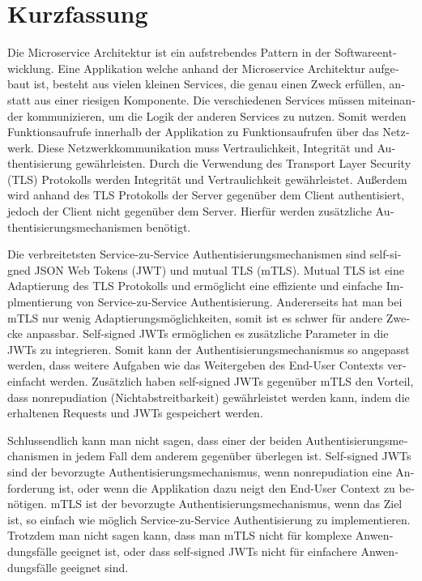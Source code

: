 \chapter{Kurzfassung}

\begin{german}
	Die Microservice Architektur ist ein aufstrebendes Pattern in der Softwareentwicklung.
	Eine Applikation welche anhand der Microservice Architektur aufgebaut ist, besteht aus vielen kleinen Services, die genau einen Zweck erfüllen, anstatt aus einer riesigen Komponente.
	Die verschiedenen Services müssen miteinander kommunizieren, um die Logik der anderen Services zu nutzen.
	Somit werden Funktionsaufrufe innerhalb der Applikation zu Funktionsaufrufen über das Netzwerk.
	Diese Netzwerkkommunikation muss Vertraulichkeit, Integrität und Authentisierung gewährleisten.
	Durch die Verwendung des Transport Layer Security (TLS) Protokolls werden Integrität und Vertraulichkeit gewährleistet.
	Außerdem wird anhand des TLS Protokolls der Server gegenüber dem Client authentisiert, jedoch der Client nicht gegenüber dem Server.
	Hierfür werden zusätzliche Authentisierungsmechanismen benötigt.

	Die verbreitetsten Service-zu-Service Authentisierungsmechanismen sind self-signed JSON Web Tokens (JWT) und mutual TLS (mTLS).
	Mutual TLS ist eine Adaptierung des TLS Protokolls und ermöglicht eine effiziente und einfache Implmentierung von Service-zu-Service Authentisierung.
	Andererseits hat man bei mTLS nur wenig Adaptierungsmöglichkeiten, somit ist es schwer für andere Zwecke anpassbar.
	Self-signed JWTs ermöglichen es zusätzliche Parameter in die JWTs zu integrieren.
	Somit kann der Authentisierungsmechanismus so angepasst werden, dass weitere Aufgaben wie das Weitergeben des End-User Contexts vereinfacht werden.
	Zusätzlich haben self-signed JWTs gegenüber mTLS den Vorteil, dass nonrepudiation (Nichtabstreitbarkeit) gewährleistet werden kann, indem die erhaltenen Requests und JWTs gespeichert werden.

	Schlussendlich kann man nicht sagen, dass einer der beiden Authentisierungsmechanismen in jedem Fall dem anderem gegenüber überlegen ist.
	Self-signed JWTs sind der bevorzugte Authentisierungsmechanismus, wenn nonrepudiation eine Anforderung ist, oder wenn die Applikation dazu neigt den End-User Context zu benötigen.
	mTLS ist der bevorzugte Authentisierungsmechanismus, wenn das Ziel ist, so einfach wie möglich Service-zu-Service Authentisierung zu implementieren.
	Trotzdem man nicht sagen kann, dass man mTLS nicht für komplexe Anwendungsfälle geeignet ist, oder dass self-signed JWTs nicht für einfachere Anwendungsfälle geeignet sind.
\end{german}
